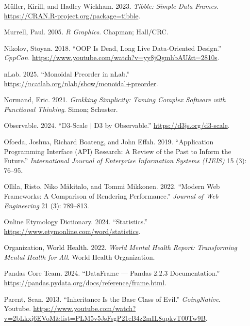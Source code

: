 \documentclass[
  openany]{book}
\newlength{\cslhangindent}
\newenvironment{CSLReferences}[2] %
 {\begin{list}{}{%
  \setlength{\itemindent}{0pt}
  \setlength{\leftmargin}{0pt}
  \setlength{\parsep}{0pt}
  \ifodd #1
   \setlength{\leftmargin}{\cslhangindent}
   \setlength{\itemindent}{-1\cslhangindent}
  \fi
  \setlength{\itemsep}{#2\baselineskip}}}
 {\end{list}}
\theoremstyle{definition}
\theoremstyle{definition}
\theoremstyle{definition}
\theoremstyle{definition}
\theoremstyle{remark}
\begin{document}
\begin{CSLReferences}{1}{0}
Müller, Kirill, and Hadley Wickham. 2023. \emph{Tibble: Simple Data Frames}. \url{https://CRAN.R-project.org/package=tibble}.

Murrell, Paul. 2005. \emph{R Graphics}. Chapman; Hall/CRC.

Nikolov, Stoyan. 2018. {``OOP Is Dead, Long Live Data-Oriented Design.''} \emph{CppCon}. \url{https://www.youtube.com/watch?v=yy8jQgmhbAU&t=2810s}.

nLab. 2025. {``Monoidal Preorder in nLab.''} \url{https://ncatlab.org/nlab/show/monoidal+preorder}.

Normand, Eric. 2021. \emph{Grokking Simplicity: Taming Complex Software with Functional Thinking}. Simon; Schuster.

Observable. 2024. {``D3-Scale {\(\vert\)} D3 by Observable.''} \url{https://d3js.org/d3-scale}.

Ofoeda, Joshua, Richard Boateng, and John Effah. 2019. {``Application Programming Interface (API) Research: A Review of the Past to Inform the Future.''} \emph{International Journal of Enterprise Information Systems (IJEIS)} 15 (3): 76--95.

Ollila, Risto, Niko Mäkitalo, and Tommi Mikkonen. 2022. {``Modern Web Frameworks: A Comparison of Rendering Performance.''} \emph{Journal of Web Engineering} 21 (3): 789--813.

Online Etymology Dictionary. 2024. {``Statistics.''} \url{https://www.etymonline.com/word/statistics}.

Organization, World Health. 2022. \emph{World Mental Health Report: Transforming Mental Health for All}. World Health Organization.

Pandas Core Team. 2024. {``DataFrame {\ifmmode---\else\textemdash\fi} Pandas 2.2.3 Documentation.''} \url{https://pandas.pydata.org/docs/reference/frame.html}.

Parent, Sean. 2013. {``Inheritance Is the Base Class of Evil.''} \emph{GoingNative}. Youtube. \url{https://www.youtube.com/watch?v=2bLkxj6EVoM&list=PLM5v5JsFsgP21eB4z2mIL8upkvT00Tw9B}.


\end{CSLReferences}
\end{document}
